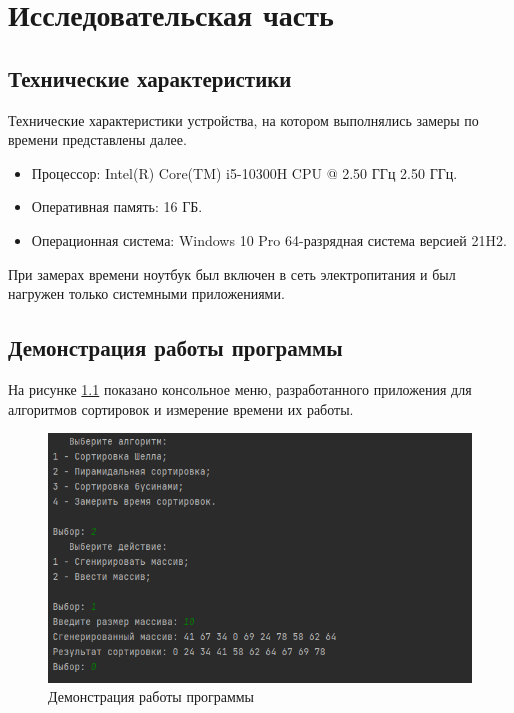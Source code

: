 \chapter{Исследовательская часть}

\section{Технические характеристики}

Технические характеристики устройства, на котором выполнялись замеры по времени представлены далее.

\begin{itemize}
	\item Процессор: Intel(R) Core(TM) i5-10300H CPU @ 2.50 ГГц 2.50 ГГц. \cite{intel}
	\item Оперативная память: 16 ГБ.
	\item Операционная система: Windows 10 Pro 64-разрядная система версией 21H2. \cite{windows}
\end{itemize}

При замерах времени ноутбук был включен в сеть электропитания и был нагружен только системными приложениями.

\clearpage

\section{Демонстрация работы программы}

На рисунке \ref{img:demonstration} показано консольное меню, разработанного приложения для алгоритмов сортировок и измерение времени их работы.

\begin{figure}[h]
	\centering
	\includegraphics[height=0.35\textheight]{img/example.png}
	\caption{Демонстрация работы программы}
	\label{img:demonstration}
\end{figure}

